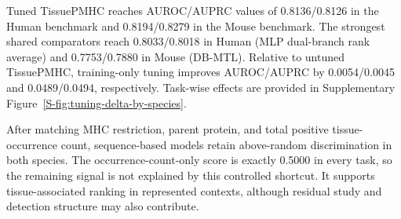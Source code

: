 Tuned TissuePMHC reaches AUROC/AUPRC values of 0.8136/0.8126 in the Human benchmark and 0.8194/0.8279 in the Mouse benchmark. The strongest shared comparators reach 0.8033/0.8018 in Human (MLP dual-branch rank average) and 0.7753/0.7880 in Mouse (DB-MTL). Relative to untuned TissuePMHC, training-only tuning improves AUROC/AUPRC by 0.0054/0.0045 and 0.0489/0.0494, respectively. Task-wise effects are provided in Supplementary Figure~\ref{S-fig:tuning-delta-by-species}.

After matching MHC restriction, parent protein, and total positive tissue-occurrence count, sequence-based models retain above-random discrimination in both species. The occurrence-count-only score is exactly 0.5000 in every task, so the remaining signal is not explained by this controlled shortcut. It supports tissue-associated ranking in represented contexts, although residual study and detection structure may also contribute.
